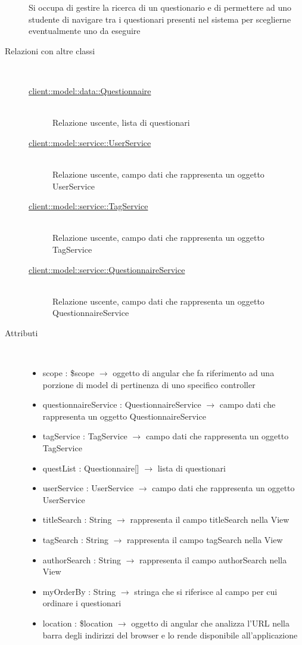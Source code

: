 \begin{description}
Si occupa di gestire la ricerca di un questionario e di permettere ad uno studente di navigare tra i questionari presenti nel sistema per sceglierne eventualmente uno da eseguire
\item[Relazioni con altre classi] \hfill \\
\vspace{-7mm}
\begin{description}
	\item[\hyperlink{client::model::data::Questionnaire}{client::model::data::Questionnaire}] \hfill \\
	Relazione uscente, lista di questionari
	\item[\hyperlink{client::model::service::UserService}{client::model::service::UserService}] \hfill \\
	Relazione uscente, campo dati che rappresenta un oggetto UserService
	\item[\hyperlink{client::model::service::TagService}{client::model::service::TagService}] \hfill \\
	Relazione uscente, campo dati che rappresenta un oggetto TagService
	\item[\hyperlink{client::model::service::QuestionnaireService}{client::model::service::QuestionnaireService}] \hfill \\
	Relazione uscente, campo dati che rappresenta un oggetto QuestionnaireService
\end{description}

\item[Attributi] \hfill \\
\vspace{-7mm}
\begin{itemize}
	\item scope : \$scope $\rightarrow$ oggetto di angular che fa riferimento ad una porzione di model di pertinenza di uno specifico controller
	\item questionnaireService : QuestionnaireService $\rightarrow$ campo dati che rappresenta un oggetto QuestionnaireService
	\item tagService : TagService $\rightarrow$ campo dati che rappresenta un oggetto TagService
	\item questList : Questionnaire[] $\rightarrow$ lista di questionari
	\item userService : UserService $\rightarrow$ campo dati che rappresenta un oggetto UserService
	\item titleSearch : String $\rightarrow$ rappresenta il campo titleSearch nella View
	\item tagSearch : String $\rightarrow$ rappresenta il campo tagSearch nella View
	\item authorSearch : String $\rightarrow$ rappresenta il campo authorSearch nella View
	\item myOrderBy : String $\rightarrow$ stringa che si riferisce al campo per cui ordinare i questionari
	\item location : \$location $\rightarrow$ oggetto di angular che analizza l'URL nella barra degli indirizzi del browser e lo rende disponibile all'applicazione
\end{itemize}


\end{description}
